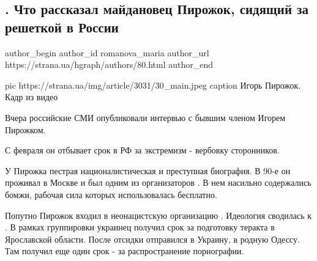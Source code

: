  
 
 
 
 
 
\subsection{. Что рассказал майдановец Пирожок, сидящий за решеткой в России}
\label{sec:27_11_2020.news.ua.strana.romanova_maria.1.pirozhok_pravyy_sektor}
\ifcmt
	author_begin
   author_id romanova_maria
	 author_url https://strana.ua/hgraph/authors/80.html
	author_end
\fi
{}

\ifcmt
	 pic https://strana.ua/img/article/3031/30_main.jpeg
	 caption Игорь Пирожок. Кадр из видео 
\fi

Вчера российские СМИ опубликовали интервью с бывшим членом 
Игорем Пирожком. 

С февраля он отбывает срок в РФ за экстремизм - вербовку сторонников. 

У Пирожка пестрая националистическая и преступная биография. В 90-е он
проживал в Москве и был одним из организаторов . В нем
насильно содержались бомжи, рабочая сила которых использовалась бесплатно.

Попутно Пирожок входил в неонацистскую организацию .
Идеология сводилась к . В рамках группировки украинец получил срок за
подготовку теракта в Ярославской области. После отсидки отправился в
Украину, в родную Одессу. Там получил еще один срок - за распространение
порнографии. 


